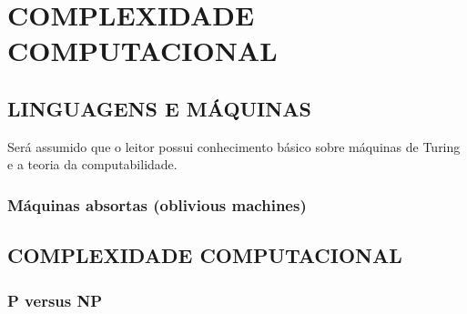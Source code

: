 \chapter{COMPLEXIDADE COMPUTACIONAL}

\section{LINGUAGENS E MÁQUINAS}

Será assumido que o leitor possui conhecimento básico
sobre máquinas de Turing e a teoria da computabilidade.


\subsection{Máquinas absortas (oblivious machines)}

\section{COMPLEXIDADE COMPUTACIONAL}

\subsection{P versus NP}

